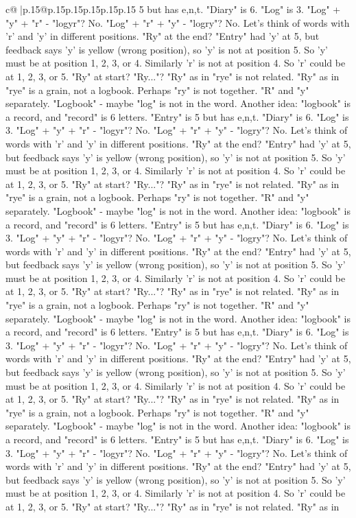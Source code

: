 \documentclass{article}
\begin{document}
{\begin{supertabular}{c@{$\;$}|p{.15\linewidth}@{}p{.15\linewidth}p{.15\linewidth}p{.15\linewidth}p{.15\linewidth}p{.15\linewidth}}
{{{5 but has e,n,t. "Diary" is 6. "Log" is 3. "Log" + "y" + "r" {-} "logyr"? No. "Log" + "r" + "y" {-} "logry"? No. Let's think of words with 'r' and 'y' in different positions. "Ry" at the end? "Entry" had 'y' at 5, but feedback says 'y' is yellow (wrong position), so 'y' is not at position 5. So 'y' must be at position 1, 2, 3, or 4. Similarly 'r' is not at position 4. So 'r' could be at 1, 2, 3, or 5. "Ry" at start? "Ry..."? "Ry" as in "rye" is not related. "Ry" as in "rye" is a grain, not a logbook. Perhaps "ry" is not together. "R" and "y" separately. "Logbook" {-} maybe "log" is not in the word. Another idea: "logbook" is a record, and "record" is 6 letters. "Entry" is 5 but has e,n,t. "Diary" is 6. "Log" is 3. "Log" + "y" + "r" {-} "logyr"? No. "Log" + "r" + "y" {-} "logry"? No. Let's think of words with 'r' and 'y' in different positions. "Ry" at the end? "Entry" had 'y' at 5, but feedback says 'y' is yellow (wrong position), so 'y' is not at position 5. So 'y' must be at position 1, 2, 3, or 4. Similarly 'r' is not at position 4. So 'r' could be at 1, 2, 3, or 5. "Ry" at start? "Ry..."? "Ry" as in "rye" is not related. "Ry" as in "rye" is a grain, not a logbook. Perhaps "ry" is not together. "R" and "y" separately. "Logbook" {-} maybe "log" is not in the word. Another idea: "logbook" is a record, and "record" is 6 letters. "Entry" is 5 but has e,n,t. "Diary" is 6. "Log" is 3. "Log" + "y" + "r" {-} "logyr"? No. "Log" + "r" + "y" {-} "logry"? No. Let's think of words with 'r' and 'y' in different positions. "Ry" at the end? "Entry" had 'y' at 5, but feedback says 'y' is yellow (wrong position), so 'y' is not at position 5. So 'y' must be at position 1, 2, 3, or 4. Similarly 'r' is not at position 4. So 'r' could be at 1, 2, 3, or 5. "Ry" at start? "Ry..."? "Ry" as in "rye" is not related. "Ry" as in "rye" is a grain, not a logbook. Perhaps "ry" is not together. "R" and "y" separately. "Logbook" {-} maybe "log" is not in the word. Another idea: "logbook" is a record, and "record" is 6 letters. "Entry" is 5 but has e,n,t. "Diary" is 6. "Log" is 3. "Log" + "y" + "r" {-} "logyr"? No. "Log" + "r" + "y" {-} "logry"? No. Let's think of words with 'r' and 'y' in different positions. "Ry" at the end? "Entry" had 'y' at 5, but feedback says 'y' is yellow (wrong position), so 'y' is not at position 5. So 'y' must be at position 1, 2, 3, or 4. Similarly 'r' is not at position 4. So 'r' could be at 1, 2, 3, or 5. "Ry" at start? "Ry..."? "Ry" as in "rye" is not related. "Ry" as in "rye" is a grain, not a logbook. Perhaps "ry" is not together. "R" and "y" separately. "Logbook" {-} maybe "log" is not in the word. Another idea: "logbook" is a record, and "record" is 6 letters. "Entry" is 5 but has e,n,t. "Diary" is 6. "Log" is 3. "Log" + "y" + "r" {-} "logyr"? No. "Log" + "r" + "y" {-} "logry"? No. Let's think of words with 'r' and 'y' in different positions. "Ry" at the end? "Entry" had 'y' at 5, but feedback says 'y' is yellow (wrong position), so 'y' is not at position 5. So 'y' must be at position 1, 2, 3, or 4. Similarly 'r' is not at position 4. So 'r' could be at 1, 2, 3, or 5. "Ry" at start? "Ry..."? "Ry" as in "rye" is not related. "Ry" as in }}}
\end{supertabular}}
\end{document}
